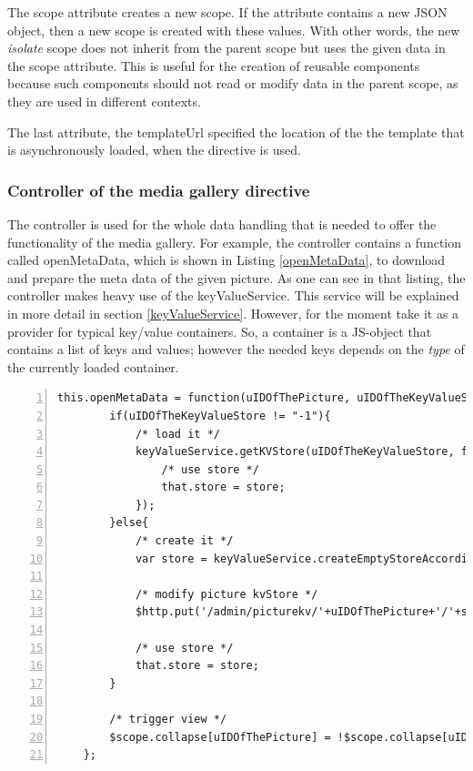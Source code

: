 The scope attribute creates a new scope. If the attribute contains a new \ac{JSON} object, then a new scope is created with these values. With other words, the new \emph{isolate} scope does not inherit from the parent scope but uses the given data in the scope attribute. This is useful for the creation of reusable components because such components should not  read or modify data in the parent scope, as they are used in different contexts. 

The last attribute, the templateUrl specified the location of the the template that is asynchronously loaded, when the directive is used.

\subsubsection{Controller of the media gallery directive}
The controller is used for the whole data handling that is needed to offer the functionality of the media gallery. For example, the controller contains a function called openMetaData, which is shown in Listing \ref{openMetaData}, to download and prepare the meta data of the given picture. As one can see in that listing, the controller makes heavy use of the keyValueService. This service will be explained in more detail in section \ref{keyValueService}. However, for the moment take it as a provider for typical key/value containers. So, a container is a \ac{JS}-object that contains a list of keys and values; however the needed keys depends on the \emph{type} of the currently loaded container. 

\begin{lstlisting}[numbers=left,caption={The listing shows the openMetaData function},label=openMetaData,frame=tlbr,breaklines]
    this.openMetaData = function(uIDOfThePicture, uIDOfTheKeyValueStore){
        if(uIDOfTheKeyValueStore != "-1"){
            /* load it */
            keyValueService.getKVStore(uIDOfTheKeyValueStore, function(store){
                /* use store */
                that.store = store;
            });
        }else{
            /* create it */
            var store = keyValueService.createEmptyStoreAccordingToType('img');

            /* modify picture kvStore */
            $http.put('/admin/picturekv/'+uIDOfThePicture+'/'+store.uID);

            /* use store */
            that.store = store;
        }

        /* trigger view */
        $scope.collapse[uIDOfThePicture] = !$scope.collapse[uIDOfThePicture];
    };
\end{lstlisting}

